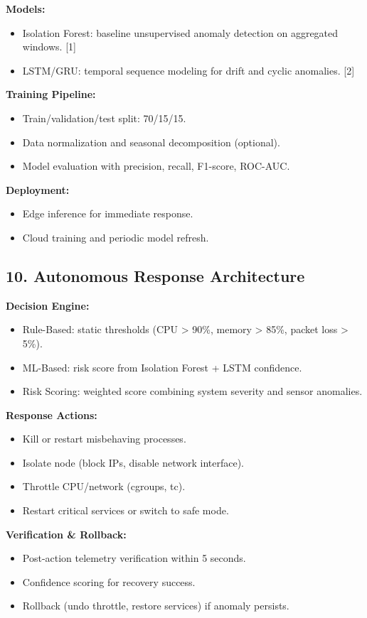\documentclass[11pt]{article}
\begin{document}
\textbf{Models:}
\begin{itemize}
    \item Isolation Forest: baseline unsupervised anomaly detection on aggregated windows. [1]
    \item LSTM/GRU: temporal sequence modeling for drift and cyclic anomalies. [2]
\end{itemize}

\textbf{Training Pipeline:}
\begin{itemize}
    \item Train/validation/test split: 70/15/15.
    \item Data normalization and seasonal decomposition (optional).
    \item Model evaluation with precision, recall, F1-score, ROC-AUC.
\end{itemize}

\textbf{Deployment:}
\begin{itemize}
    \item Edge inference for immediate response.
    \item Cloud training and periodic model refresh.
\end{itemize}

\subsection{10. Autonomous Response Architecture}
\textbf{Decision Engine:}
\begin{itemize}
    \item Rule-Based: static thresholds (CPU > 90\%, memory > 85\%, packet loss > 5\%).
    \item ML-Based: risk score from Isolation Forest + LSTM confidence.
    \item Risk Scoring: weighted score combining system severity and sensor anomalies.
\end{itemize}

\textbf{Response Actions:}
\begin{itemize}
    \item Kill or restart misbehaving processes.
    \item Isolate node (block IPs, disable network interface).
    \item Throttle CPU/network (cgroups, tc).
    \item Restart critical services or switch to safe mode.
\end{itemize}

\textbf{Verification \& Rollback:}
\begin{itemize}
    \item Post-action telemetry verification within 5 seconds.
    \item Confidence scoring for recovery success.
    \item Rollback (undo throttle, restore services) if anomaly persists.
\end{itemize}
\end{document}
